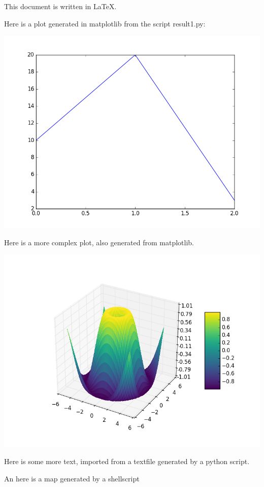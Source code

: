 \documentclass[11pt,a4paper]{article}
\begin{document}
This document is written in \LaTeX.

Here is a plot generated in matplotlib from the script result1.py:

\includegraphics[scale=0.5]{fig/plot1.png}

Here is a more complex plot, also generated from matplotlib. 

\includegraphics[scale=0.5]{fig/plot2.png}


Here is some more text, imported from a textfile generated by a python script. 



An here is a map generated by a shellscript
\end{document}
